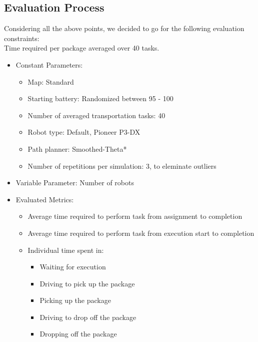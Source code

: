 \documentclass[journal]{IEEEtran}
\begin{document}
\subsection{Evaluation Process}
Considering all the above points, we decided to go for the following evaluation constraints:
\\
Time required per package averaged over 40 tasks.
\begin{itemize}
\item Constant Parameters:

\begin{itemize}
\item Map: Standard
\item Starting battery: Randomized between 95 - 100%
\item Number of averaged transportation tasks: 40
\item Robot type: Default, Pioneer P3-DX 
\item Path planner: Smoothed-Theta*
\item Number of repetitions per simulation: 3, to eleminate outliers
\end{itemize}

\item Variable Parameter: Number of robots
\item Evaluated Metrics:

\begin{itemize}
\item Average time required to perform task from assignment to completion
\item Average time required to perform task from execution start to completion
\item Individual time spent in:	
\begin{itemize}
\item Waiting for execution
\item Driving to pick up the package	
\item Picking up the package	
\item Driving to drop off the package	
\item Dropping off the package		

\end{itemize}

\end{itemize}

\end{itemize}
\end{document}
